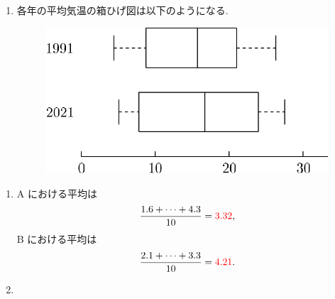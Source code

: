 \begin{qenumerate}
{\begin{enumerate}
{				したがって, 1991 年のデータについて: 
				\begin{align}
					\text{第 1 四分位数: } &\dfrac{7.6 + 9.9}{2} = \red{8.75} \\
					\text{中央値: } &\dfrac{13.9 + 17.5}{2} = \red{15.7} \\
					\text{第 3 四分位数: } &\dfrac{20.2 + 21.8}{2} = \red{21.0} \\
					\text{四分位範囲: } &21 - 8.75 = \red{12.25}
				\end{align}
				2021 年のデータについて: 
				\begin{align}
					\text{第 1 四分位数: } &\dfrac{7.5 + 8.1}{2} = \red{7.8} \\
					\text{中央値: } &\dfrac{14.9 + 18.5}{2} = \red{16.7} \\
					\text{第 3 四分位数: } &\dfrac{22.8 + 25.1}{2} = \red{23.95} \\
					\text{四分位範囲は: } &23.95 - 7.8 = \red{16.15}
				\end{align}
			}
			\item{
				各年の平均気温の箱ひげ図は以下のようになる.
				\begin{figure}[H]
					\centering
					\includegraphics[scale = 0.5]{./figure/105.pdf}
				\end{figure}
			}
		\end{enumerate}
	}
	\item{
		\begin{enumerate}
			\item{
				A における平均は
				\begin{align}
					\frac{1.6 + \cdots + 4.3}{10} = \textcolor{red}{3.32}, 
				\end{align}
				B における平均は
				\begin{align}
					\frac{2.1 + \cdots + 3.3}{10} = \textcolor{red}{4.21}.
				\end{align}
			}
			\item{
}
\end{enumerate}}
\end{qenumerate}
